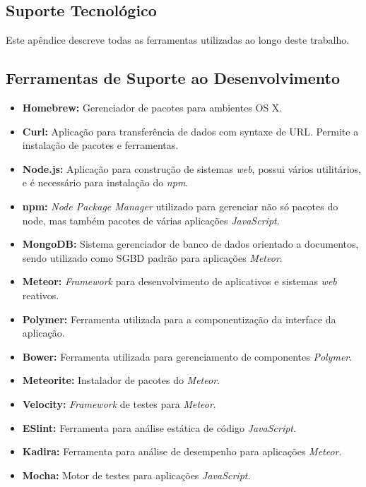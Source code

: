 \begin{apendicesenv}

\partapendices

\chapter{Suporte Tecnológico}

Este apêndice descreve todas as ferramentas utilizadas ao longo deste trabalho.

\section{Ferramentas de Suporte ao Desenvolvimento}
\begin{itemize}
	\item \textbf{Homebrew:} Gerenciador de pacotes para ambientes OS X.
	\item \textbf{Curl:} Aplicação para transferência de dados com syntaxe de URL. Permite a instalação de pacotes e ferramentas.
	\item \textbf{Node.js:} Aplicação para construção de sistemas \textit{web}, possui vários utilitários, e é necessário para instalação do \textit{npm}.
	\item \textbf{npm:} \textit{Node Package Manager} utilizado para gerenciar não só pacotes do node, mas também pacotes de várias aplicações \textit{JavaScript}.
	\item \textbf{MongoDB:} Sistema gerenciador de banco de dados orientado a documentos, sendo utilizado como SGBD padrão para aplicações \textit{Meteor}.
	\item \textbf{Meteor:} \textit{Framework} para desenvolvimento de aplicativos e sistemas \textit{web} reativos. 
	\item \textbf{Polymer:} Ferramenta utilizada para a componentização da interface da aplicação.
	\item \textbf{Bower:}  Ferramenta utilizada para gerenciamento de componentes \textit{Polymer}.
	\item \textbf{Meteorite:} Instalador de pacotes do \textit{Meteor}.
	\item \textbf{Velocity:} \textit{Framework} de testes para \textit{Meteor}.
	\item \textbf{ESlint:} Ferramenta para análise estática de código \textit{JavaScript}.
	\item \textbf{Kadira:} Ferramenta para análise de desempenho para aplicações \textit{Meteor}.
	\item \textbf{Mocha:} Motor de testes para aplicações \textit{JavaScript}.

\end{itemize}
\end{apendicesenv}
